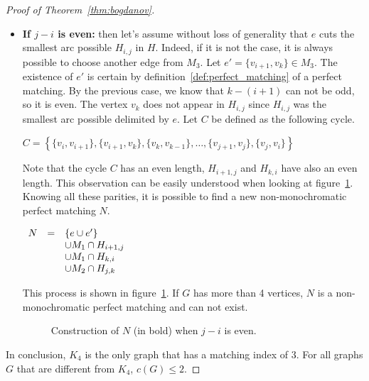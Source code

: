 \begin{proof}[Proof of Theorem~\ref{thm:bogdanov}]
\begin{itemize}
        \item 
            \textbf{If $j - i$ is even:} then let's assume without loss of generality that $e$ cuts the smallest arc possible $H_{i, j}$ in $H$.
            Indeed, if it is not the case, it is always possible to choose another edge from $M_3$.
            Let $e' = \{v_{i + 1}, v_k\} \in M_3$.
            The existence of $e'$ is certain by definition~\ref{def:perfect_matching} of a perfect matching.
            By the previous case, we know that $k - (i + 1)$ can not be odd, so it is even.
            The vertex $v_k$ does not appear in $H_{i, j}$ since $H_{i, j}$ was the smallest arc possible delimited by $e$.
            Let $C$ be defined as the following cycle.
            
            \begin{center}
                $C = \left\{
                    \{v_i, v_{i + 1}\}, \{v_{i+1}, v_k\}, \{v_k, v_{k - 1}\}, \dots, \{v_{j+1}, v_j\}, \{v_j, v_i\}
                \right\}$
            \end{center}
            
            Note that the cycle $C$ has an even length, $H_{i+1, j}$ and $H_{k, i}$ have also an even length.
            This observation can be easily understood when looking at figure~\ref{fig:proof_simplified_even}.
            Knowing all these parities, it is possible to find a new non-monochromatic perfect matching $N$.
            
            \begin{center}
                $\begin{array}{r c l}
                    N & = & \{e \cup e'\} \\
                      &   & \cup M_1 \cap H_{i+1, j} \\
                      &   & \cup M_1 \cap H_{k, i} \\
                      &   & \cup M_2 \cap H_{j, k}
                \end{array}$
            \end{center}
            
            This process is shown in figure~\ref{fig:proof_simplified_even}.
            If $G$ has more than 4 vertices, $N$ is a non-monochromatic perfect matching and can not exist.
            
            \begin{figure}[H]
                \caption{Construction of $N$ (in bold) when $j - i$ is even.}
                \label{fig:proof_simplified_even}
            \end{figure}
    \end{itemize}

    In conclusion, $K_4$ is the only graph that has a matching index of 3.
    For all graphs $G$ that are different from $K_4$, $c(G) \leq 2$.
\end{proof}


